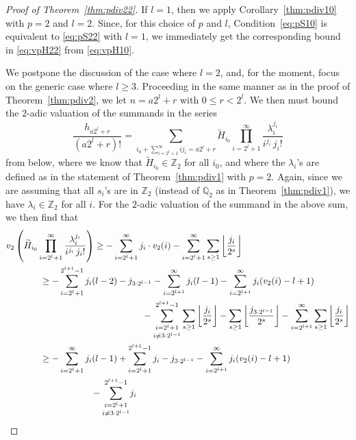 \documentclass[12pt,reqno]{amsart}
\numberwithin{equation}{section}
\theoremstyle{remark}
\begin{document}
\begin{proof}[Proof of Theorem~{\em \ref{thm:pdiv22}}]
If $l=1$, then we apply Corollary~\ref{thm:pdiv10} with $p=2$ and
$l=2$. Since, for this choice of $p$ and $l$, Condition~\eqref{eq:pS10} is
equivalent to \eqref{eq:pS22} with $l=1$, we immediately get 
the corresponding bound in \eqref{eq:vpH22} from \eqref{eq:vpH10}.

We postpone the discussion of the case where $l=2$, and, for the moment,
focus 
on the generic case where $l\ge3$. Proceeding in the same manner
as in the proof of Theorem~\ref{thm:pdiv2},
we let $n=a2^l+r$ with $0\le r<2^l$. We then must bound
the $2$-adic valuation of the summands in the series
\begin{equation} \label{eq:H-H5} 
\frac {h_{a2^l+r}} {(a2^l+r)!}=
\sum_{i_0+\sum_{i=2^l+1}^\infty ij_i=a2^l+r}
\widetilde H_{i_0}
\prod _{i=2^l+1} ^{\infty}
\frac {{\lambda}_i^{j_i}}
{i^{j_i}\,j_i!}
\end{equation}
from below,
where we know that $\widetilde H_{i_0}\in {\mathbb{Z}}_2$ for all $i_0$, 
and where the ${\lambda}_i$'s
are defined as in the statement of Theorem~\ref{thm:pdiv1} with
$p=2$. Again, since
we are assuming that all $s_i$'s are in ${\mathbb{Z}}_2$ (instead of
${\mathbb{Q}}_2$ as in Theorem~\ref{thm:pdiv1}), we have ${\lambda}_i\in {\mathbb{Z}}_2$
for all $i$. For the $2$-adic valuation of the summand in the above
sum, we then find that
{\allowdisplaybreaks
\begin{align}
\notag
v_2&\left(\widetilde H_{i_0}
\prod _{i=2^l+1} ^{\infty}
\frac {{\lambda}_i^{j_i}}
{i^{j_i}\,j_i!}\right)
\ge -\sum_{i=2^l+1}^\infty j_i\cdot v_2(i)
-\sum_{i=2^l+1}^\infty\sum_{s\ge1}{\left\lfloor{\frac {j_i} {2^s}}\right\rfloor}\\
\notag
&\kern1cm
\ge
-\sum_{i=2^l+1}^{2^{l+1}-1} j_i(l-2)-j_{3\cdot 2^{l-1}}
-\sum_{i=2^{l+1}}^\infty j_i(l-1)
-\sum_{i=2^{l+1}}^\infty j_i(v_2(i)-l+1)\\
\notag
&\kern5cm
-\underset{i\ne 3\cdot 2^{l-1}}
{\sum_{i=2^l+1}^{2^{l+1}-1}}\sum_{s\ge1}{\left\lfloor{\frac {j_i} {2^s}}\right\rfloor}
-\sum_{s\ge1}{\left\lfloor{\frac {j_{3\cdot 2^{l-1}}} {2^s}}\right\rfloor}
-\sum_{i=2^{l+1}}^\infty\sum_{s\ge1}{\left\lfloor{\frac {j_i} {2^s}}\right\rfloor}\\
\notag
&\kern1cm
\ge
-\sum_{i=2^l+1}^\infty j_i(l-1)
+\sum_{i=2^l+1}^{2^{l+1}-1} j_i
-j_{3\cdot 2^{l-1}}
-\sum_{i=2^{l+1}}^\infty j_i(v_2(i)-l+1)
\\
\notag
&\kern3cm
-\underset{i\ne 3\cdot 2^{l-1}}
{\sum_{i=2^l+1}^{2^{l+1}-1}}{j_i} 

\end{align}}
\end{proof}
\end{document}
